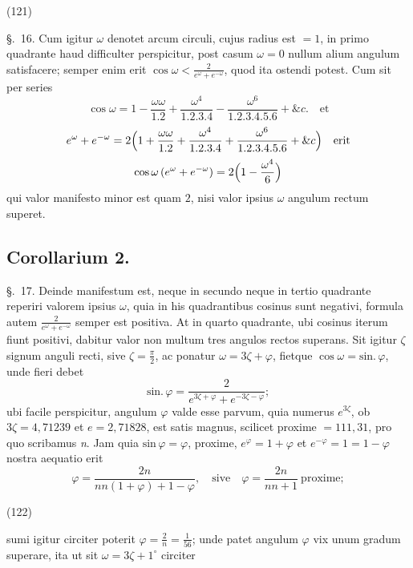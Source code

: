 \documentclass[11pt,a4paper]{article}
\begin{document}
(121)

§.~16. Cum igitur $\omega$ denotet arcum circuli, cujus radius est $= 1$, in primo
quadrante haud difficulter perspicitur, post casum $\omega = 0$ nullum alium angulum
satisfacere; semper enim erit $\cos\omega < \frac{2}{e^\omega + e^{-\omega}}$, quod ita
ostendi potest. Cum sit per series
\[
\cos\omega = 1 - \frac{\omega\omega}{1.2} + \frac{\omega^4}{1.2.3.4} - \frac{\omega^6}{1.2.3.4.5.6} + \&c. \quad\text{et}
\]
\[
e^\omega + e^{-\omega} = 2\Bigl(1 + \frac{\omega\omega}{1.2} + \frac{\omega^4}{1.2.3.4} + \frac{\omega^6}{1.2.3.4.5.6} + \&c\Bigr) \quad\text{erit}
\]
\[
\cos\omega\,(e^\omega + e^{-\omega}) = 2\Bigl(1 - \frac{\omega^4}{6}\Bigr)
\]
qui valor manifesto minor est quam $2$, nisi valor ipsius $\omega$ angulum rectum
superet.

\subsection*{Corollarium 2.}

§.~17. Deinde manifestum est, neque in secundo neque in tertio quadrante reperiri
valorem ipsius $\omega$, quia in his quadrantibus cosinus sunt negativi, formula
autem $\frac{2}{e^\omega + e^{-\omega}}$ semper est positiva. At in quarto quadrante,
ubi cosinus iterum fiunt positivi, dabitur valor non multum tres angulos rectos
superans. Sit igitur $\zeta$ signum anguli recti, sive $\zeta = \frac{\pi}{2}$, ac
ponatur $\omega = 3\zeta + \varphi$, fietque $\cos\omega = \text{sin.}\,\varphi$, unde fieri debet
\[
\text{sin.}\,\varphi = \frac{2}{e^{3\zeta+\varphi} + e^{-3\zeta-\varphi}};
\]
ubi facile perspicitur, angulum $\varphi$ valde esse parvum, quia numerus
$e^{3\zeta}$, ob $3\zeta = 4{,}71239$ et $e = 2{,}71828$, est satis magnus, scilicet
proxime $= 111{,}31$, pro quo scribamus \emph{n}. Jam quia $\text{sin}\,\varphi = \varphi$,
proxime, $e^\varphi = 1 + \varphi$ et $e^{-\varphi} = 1 = 1 - \varphi$ nostra aequatio erit
\[
\varphi = \frac{2n}{nn(1+\varphi) + 1 - \varphi}, \quad\text{sive}\quad \varphi = \frac{2n}{nn+1} \ \text{proxime};
\]

(122)

sumi igitur circiter poterit $\varphi = \frac{2}{n} = \frac{1}{56}$; unde patet angulum
$\varphi$ vix unum gradum superare, ita ut sit $\omega = 3\zeta + 1^\circ$ circiter
\end{document}
